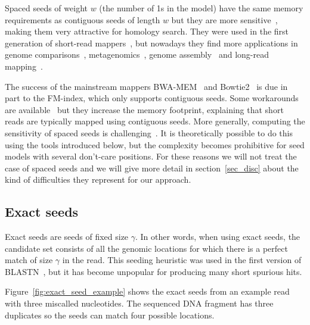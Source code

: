 \documentclass{article}
\begin{document}
Spaced seeds of weight $w$ (the number of 1s in the model) have the same
memory requirements as contiguous seeds of length $w$ but they are more
sensitive~\cite{li2006superiority}, making them very attractive for
homology search. They were used in the first generation of short-read
mappers~\cite{pmid18684737, pmid19461883, pmid19675096, pmid2945724}, but
nowadays they find more applications in genome
comparisons~\cite{pmid21209072, healy2016flak},
metagenomics~\cite{pmid26209798, pmid27540266}, genome
assembly~\cite{pmid26539459} and long-read mapping~\cite{pmid27079541}.

The success of the mainstream mappers BWA-MEM~\cite{li2013aligning} and
Bowtie2~\cite{pmid22388286} is due in part to the FM-index, which only
supports contiguous seeds. Some workarounds are
available~\cite{horton2008dislex, gagie2017compressed} but they increase
the memory footprint, explaining that short reads are typically mapped
using contiguous seeds. More generally, computing the sensitivity of
spaced seeds is challenging~\cite{pmid16819802, li2006superiority,
martin2017faster}. It is theoretically possible to do this using the
tools introduced below, but the complexity becomes prohibitive for seed
models with several don't-care positions. For these reasons we will not
treat the case of spaced seeds and we will give more detail in
section~\ref{sec_disc} about the kind of difficulties they represent for
our approach.

\subsection{Exact seeds}

Exact seeds are seeds of fixed size $\gamma$. In other words, when using
exact seeds, the candidate set consists of all the genomic locations for
which there is a perfect match of size $\gamma$ in the read. This seeding
heuristic was used in the first version of BLASTN~\cite{pmid2231712}, but
it has become unpopular for producing many short spurious hits.

Figure~\ref{fig:exact_seed_example} shows the exact seeds from an example
read with three miscalled nucleotides. The sequenced DNA fragment has
three duplicates so the seeds can match four possible locations.
\end{document}
